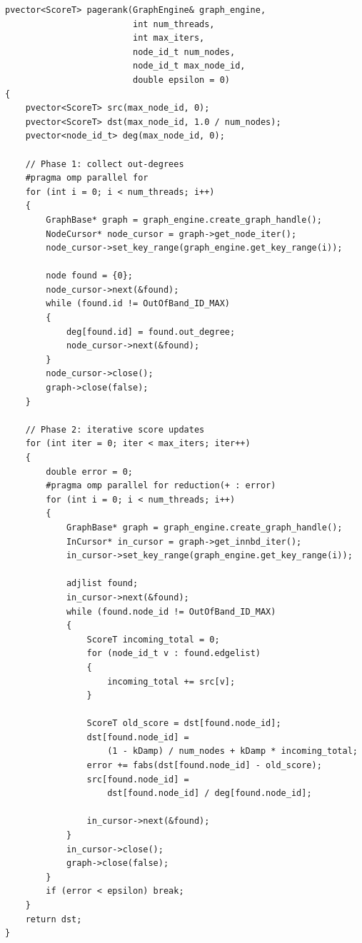 \begin{lstlisting}[style=cpp, label={lst:pagerank_graphapi}, caption={GAPBS PageRank kernel adapted to use the \api{}.  Each thread creates its own \code{GraphBase} handle and cursors, scoped to a disjoint partition.}, captionpos=b]
pvector<ScoreT> pagerank(GraphEngine& graph_engine,
                         int num_threads,
                         int max_iters,
                         node_id_t num_nodes,
                         node_id_t max_node_id,
                         double epsilon = 0)
{
    pvector<ScoreT> src(max_node_id, 0);
    pvector<ScoreT> dst(max_node_id, 1.0 / num_nodes);
    pvector<node_id_t> deg(max_node_id, 0);

    // Phase 1: collect out-degrees
    #pragma omp parallel for
    for (int i = 0; i < num_threads; i++)
    {
        GraphBase* graph = graph_engine.create_graph_handle();
        NodeCursor* node_cursor = graph->get_node_iter();
        node_cursor->set_key_range(graph_engine.get_key_range(i));

        node found = {0};
        node_cursor->next(&found);
        while (found.id != OutOfBand_ID_MAX)
        {
            deg[found.id] = found.out_degree;
            node_cursor->next(&found);
        }
        node_cursor->close();
        graph->close(false);
    }

    // Phase 2: iterative score updates
    for (int iter = 0; iter < max_iters; iter++)
    {
        double error = 0;
        #pragma omp parallel for reduction(+ : error)
        for (int i = 0; i < num_threads; i++)
        {
            GraphBase* graph = graph_engine.create_graph_handle();
            InCursor* in_cursor = graph->get_innbd_iter();
            in_cursor->set_key_range(graph_engine.get_key_range(i));

            adjlist found;
            in_cursor->next(&found);
            while (found.node_id != OutOfBand_ID_MAX)
            {
                ScoreT incoming_total = 0;
                for (node_id_t v : found.edgelist)
                {
                    incoming_total += src[v];
                }

                ScoreT old_score = dst[found.node_id];
                dst[found.node_id] =
                    (1 - kDamp) / num_nodes + kDamp * incoming_total;
                error += fabs(dst[found.node_id] - old_score);
                src[found.node_id] =
                    dst[found.node_id] / deg[found.node_id];

                in_cursor->next(&found);
            }
            in_cursor->close();
            graph->close(false);
        }
        if (error < epsilon) break;
    }
    return dst;
}
\end{lstlisting}

